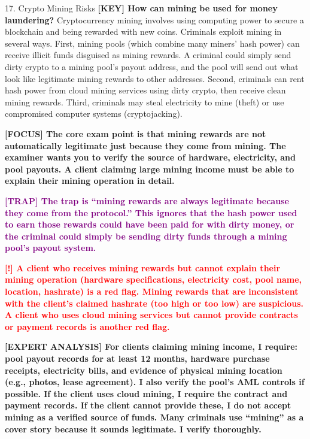 \documentclass[11pt,a4paper]{beamer}
\newcommand{\redflag}[1]{\textcolor{red}{\textbf{[!] #1}}}
\newcommand{\examfocus}[1]{\textcolor{orange!80!black}{\textbf{[FOCUS] #1}}}
\newcommand{\trap}[1]{\textcolor{purple}{\textbf{[TRAP] #1}}}
\newcommand{\keyterm}[1]{\textcolor{red!80!black}{\textbf{[KEY] #1}}}
\newcommand{\expert}[1]{\textcolor{blue!70!black}{\textbf{[EXPERT ANALYSIS] #1}}}
\begin{document}
	\begin{frame}{17. Crypto Mining Risks}
		\tiny
		\keyterm{How can mining be used for money laundering?} Cryptocurrency mining involves using computing power to secure a blockchain and being rewarded with new coins. Criminals exploit mining in several ways. First, mining pools (which combine many miners' hash power) can receive illicit funds disguised as mining rewards. A criminal could simply send dirty crypto to a mining pool's payout address, and the pool will send out what look like legitimate mining rewards to other addresses. Second, criminals can rent hash power from cloud mining services using dirty crypto, then receive clean mining rewards. Third, criminals may steal electricity to mine (theft) or use compromised computer systems (cryptojacking).
		
		\vspace{0.1cm}
		\examfocus{The core exam point is that mining rewards are not automatically legitimate just because they come from mining. The examiner wants you to verify the source of hardware, electricity, and pool payouts. A client claiming large mining income must be able to explain their mining operation in detail.}
		
		\vspace{0.1cm}
		\trap{The trap is “mining rewards are always legitimate because they come from the protocol.” This ignores that the hash power used to earn those rewards could have been paid for with dirty money, or the criminal could simply be sending dirty funds through a mining pool's payout system.}
		
		\vspace{0.1cm}
		\redflag{A client who receives mining rewards but cannot explain their mining operation (hardware specifications, electricity cost, pool name, location, hashrate) is a red flag. Mining rewards that are inconsistent with the client's claimed hashrate (too high or too low) are suspicious. A client who uses cloud mining services but cannot provide contracts or payment records is another red flag.}
		
		\vspace{0.1cm}
		\expert{For clients claiming mining income, I require: pool payout records for at least 12 months, hardware purchase receipts, electricity bills, and evidence of physical mining location (e.g., photos, lease agreement). I also verify the pool's AML controls if possible. If the client uses cloud mining, I require the contract and payment records. If the client cannot provide these, I do not accept mining as a verified source of funds. Many criminals use “mining” as a cover story because it sounds legitimate. I verify thoroughly.}
	\end{frame}
	
\end{document}

